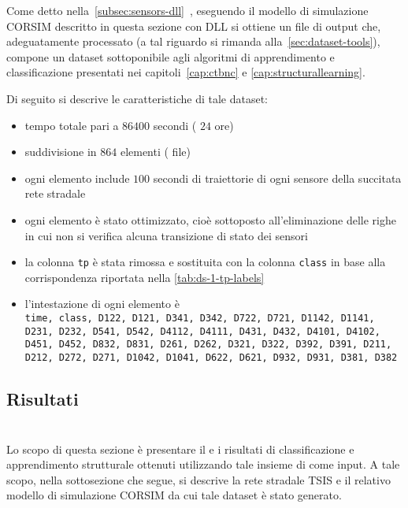 Come detto nella~\autoref{subsec:sensors-dll}~, eseguendo il modello di simulazione \acs{CORSIM} descritto in questa sezione con  \acs{DLL} si ottiene un file di output che, adeguatamente processato (a tal riguardo si rimanda alla~\vref{sec:dataset-tools}), compone un dataset sottoponibile agli algoritmi di apprendimento e classificazione presentati nei capitoli~\ref{cap:ctbnc} e \ref{cap:structurallearning}.

Di seguito si descrive le caratteristiche di tale dataset:
\begin{itemize}
	\item tempo totale pari a $86400$ secondi (\ie{} $24$ ore)
	\item suddivisione in $864$ elementi (\ie{} file)
	\item ogni elemento include $100$ secondi di traiettorie di ogni sensore della succitata rete stradale
	\item ogni elemento è stato ottimizzato, cioè sottoposto all'eliminazione delle righe in cui non si verifica alcuna transizione di stato dei sensori
	\item la colonna \lstinline[]|tp| è stata rimossa e sostituita con la colonna \lstinline[]|class| in base alla corrispondenza riportata nella \vref{tab:ds-1-tp-labels}
	\item l'intestazione di ogni elemento è \\ \lstinline[]|time, class, D122, D121, D341, D342, D722, D721, D1142, D1141, D231, D232, D541, D542, D4112, D4111, D431, D432, D4101, D4102, D451, D452, D832, D831, D261, D262, D321, D322, D392, D391, D211, D212, D272, D271, D1042, D1041, D622, D621, D932, D931, D381, D382|
\end{itemize}

\subsection{Risultati}

\section{}\label{sec:dataset-2}
Lo scopo di questa sezione è presentare il  e i risultati di classificazione e apprendimento strutturale ottenuti utilizzando tale insieme di \emph{} come input. A tale scopo, nella sottosezione che segue, si descrive la rete stradale \acs{TSIS} e il relativo modello di simulazione \acs{CORSIM} da cui tale dataset è stato generato.

